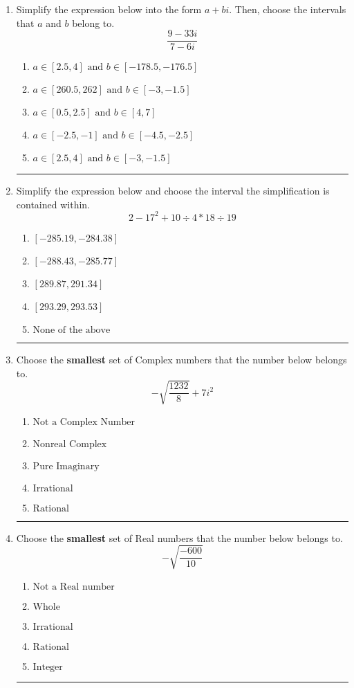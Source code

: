 \documentclass[14pt]{extbook}
\newcommand{\litem}[1]{\item#1\hspace*{-1cm}\rule{\textwidth}{0.4pt}}
\begin{document}
\begin{enumerate}
{\begin{enumerate}[label=\Alph*.]
\end{enumerate} }
\litem{
Simplify the expression below into the form $a+bi$. Then, choose the intervals that $a$ and $b$ belong to.\[ \frac{9 - 33 i}{7 - 6 i} \]\begin{enumerate}[label=\Alph*.]
\item \( a \in [2.5, 4] \text{ and } b \in [-178.5, -176.5] \)
\item \( a \in [260.5, 262] \text{ and } b \in [-3, -1.5] \)
\item \( a \in [0.5, 2.5] \text{ and } b \in [4, 7] \)
\item \( a \in [-2.5, -1] \text{ and } b \in [-4.5, -2.5] \)
\item \( a \in [2.5, 4] \text{ and } b \in [-3, -1.5] \)

\end{enumerate} }
\litem{
Simplify the expression below and choose the interval the simplification is contained within.\[ 2 - 17^2 + 10 \div 4 * 18 \div 19 \]\begin{enumerate}[label=\Alph*.]
\item \( [-285.19, -284.38] \)
\item \( [-288.43, -285.77] \)
\item \( [289.87, 291.34] \)
\item \( [293.29, 293.53] \)
\item \( \text{None of the above} \)

\end{enumerate} }
\litem{
Choose the \textbf{smallest} set of Complex numbers that the number below belongs to.\[ -\sqrt{\frac{1232}{8}}+7i^2 \]\begin{enumerate}[label=\Alph*.]
\item \( \text{Not a Complex Number} \)
\item \( \text{Nonreal Complex} \)
\item \( \text{Pure Imaginary} \)
\item \( \text{Irrational} \)
\item \( \text{Rational} \)

\end{enumerate} }
\litem{
Choose the \textbf{smallest} set of Real numbers that the number below belongs to.\[ -\sqrt{\frac{-600}{10}} \]\begin{enumerate}[label=\Alph*.]
\item \( \text{Not a Real number} \)
\item \( \text{Whole} \)
\item \( \text{Irrational} \)
\item \( \text{Rational} \)
\item \( \text{Integer} \)


\end{enumerate}}
\end{enumerate}
\end{document}
